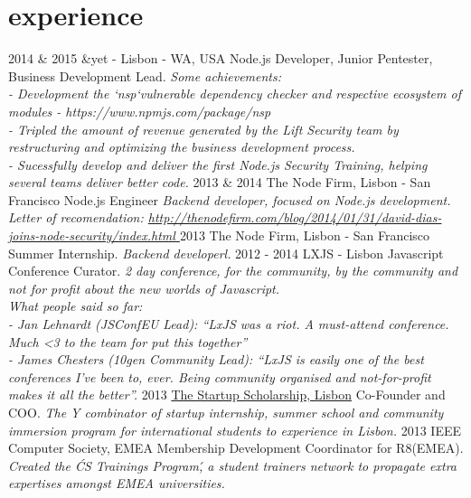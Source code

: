 \documentclass[]{friggeri-cv}
\begin{document}
\section{experience}

\begin{entrylist}
  \entry
    {2014 \& 2015}
    {\&yet - Lisbon -  WA, USA}
    {Node.js Developer, Junior Pentester, Business Development Lead.}
    {\emph{Some achievements:\\
        - Development the `nsp`vulnerable dependency checker and respective ecosystem of modules - https://www.npmjs.com/package/nsp\\
        - Tripled the amount of revenue generated by the Lift Security team by restructuring and optimizing the business development process.\\
        - Sucessfully develop and deliver the first Node.js Security Training, helping several teams deliver better code.}}
  \entry
    {2013 \& 2014}
    {The Node Firm, Lisbon - San Francisco}
    {Node.js Engineer}
    {\emph{Backend developer, focused on Node.js development. Letter of recomendation: \href{http://thenodefirm.com/blog/2014/01/31/david-dias-joins-node-security/index.html}{http://thenodefirm.com/blog/2014/01/31/david-dias-joins-node-security/index.html }}}
  \entry
    {2013}
    {The Node Firm, Lisbon - San Francisco}
    {Summer Internship.}
    {\emph{Backend developerl.}}
  \entry
    {2012 - 2014}
    {LXJS - Lisbon Javascript Conference}
    {Curator.}
    {\emph{2 day conference, for the community, by the community and not for profit about the new worlds of Javascript.\\
    What people said so far: \\
      - Jan Lehnardt (JSConfEU Lead): “LxJS was a riot. A must-attend conference. Much <3 to the team for put this together”\\
      - James Chesters (10gen Community Lead): “LxJS is easily one of the best conferences I’ve been to, ever. Being community  organised and not-for-profit makes it all the better”.}}
  \entry
    {2013}
    {\href{http://startupscholarship.org/}{The Startup Scholarship, Lisbon}}
    {Co-Founder and COO.}
    {\emph{The Y combinator of startup internship, summer school and community immersion program for international students to experience in Lisbon.}}
  \entry
    {2013}
    {IEEE Computer Society, EMEA}
    {Membership Development Coordinator for R8(EMEA).}
    {\emph{Created the \'CS Trainings Program\', a student trainers network to propagate extra expertises amongst EMEA universities.}}    
\end{entrylist}
\end{document}
